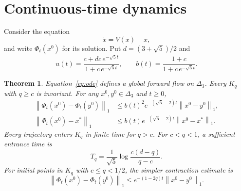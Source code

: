 \documentclass[11pt]{amsart}
\newtheorem{theorem}{Theorem}[section]
\theoremstyle{definition}
\newcommand{\D}{\Delta_3}
\newcommand{\norm}[1]{\left\lVert#1\right\rVert_1}
\begin{document}
\section{Continuous-time dynamics}\label{sec:flow}
Consider the equation
\begin{equation}\label{eq:ode}
 \dot x=V(x)-x,
\end{equation}
and write $\Phi_t(x^0)$ for its solution. Put $d=(3+\sqrt5)/2$ and
\begin{equation}\label{eq:u}
 u(t)=\frac{c+dc\,e^{-\sqrt5t}}{1+c\,e^{-\sqrt5t}},
 \qquad b(t)=\frac{1+c}{1+c\,e^{-\sqrt5t}}.
\end{equation}

\begin{theorem}\label{thm:flow}
Equation~\eqref{eq:ode} defines a global forward flow on $\D$. Every $K_q$ with $q\ge c$ is invariant. For any $x^0,y^0\in\D$ and $t\ge0$,
\begin{align}
 \norm{\Phi_t(x^0)-\Phi_t(y^0)}
 &\le b(t)^2e^{-(\sqrt5-2)t}\norm{x^0-y^0},\label{eq:flowtwo}\\
 \norm{\Phi_t(x^0)-x^*}
 &\le b(t)e^{-(\sqrt5-2)t}\norm{x^0-x^*}.\label{eq:flowone}
\end{align}
Every trajectory enters $K_q$ in finite time for $q>c$. For $c<q<1$, a sufficient entrance time is
\begin{equation}\label{eq:entry}
 T_q=\frac1{\sqrt5}\log\frac{c(d-q)}{q-c}.
\end{equation}
For initial points in $K_q$ with $c\le q<1/2$, the simpler contraction estimate is
\begin{equation}\label{eq:flowcap}
 \norm{\Phi_t(x^0)-\Phi_t(y^0)}
 \le e^{-(1-2q)t}\norm{x^0-y^0}.
\end{equation}
\end{theorem}
\end{document}
